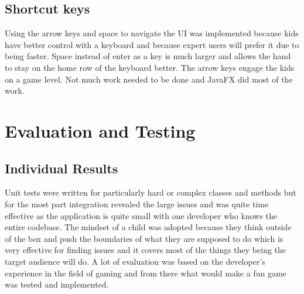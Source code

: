 \documentclass[conference]{IEEEtran}
\begin{document}
	\subsection{Shortcut keys}
	Using the arrow keys and space to navigate the UI was implemented because kids have better control with a keyboard and because expert users will prefer it due to being faster. Space instead of enter as a key is much larger and allows the hand to stay on the home row of the keyboard better. The arrow keys engage the kids on a game level. Not much work needed to be done and JavaFX did most of the work.
	
	\section{Evaluation and Testing}
	\subsection{Individual Results}
	Unit tests were written for particularly hard or complex classes and methods but for the most part integration revealed the large issues and was quite time effective as the application is quite small with one developer who knows the entire codebase. The mindset of a child was adopted because they think outside of the box and push the boundaries of what they are supposed to do which is very effective for finding issues and it covers most of the things they being the target audience will do. A lot of evaluation was based on the developer's experience in the field of gaming and from there what would make a fun game was tested and implemented.
\end{document}

